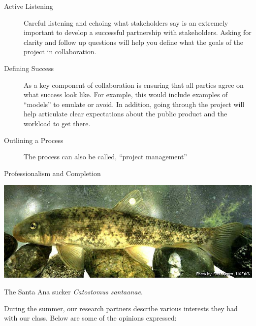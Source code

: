\documentclass{tufte-handout}\usepackage[]{graphicx}\usepackage[]{color}
\begin{document}
\begin{description}
  \item[Active Listening] Careful listening and echoing what stakeholders say is an extremely important to develop a successful partnership with stakeholders. Asking for clarity and follow up questions will help you define what the goals of the project in collaboration.
  \item[Defining Success] As a key component of collaboration is ensuring that all parties agree on what success look like. For example, this would include examples of ``models'' to emulate or avoid. In addition, going through the project will help articulate clear expectations about the public product and the workload to get there.
  \item[Outlining a Process] The process can also be called, ``project management''
  \item[Professionalism and Completion]
\end{description}

\begin{marginfigure}
   \includegraphics[width=1.0\textwidth]{Catostomus_santaanae.jpg}
  \caption{The Santa Ana sucker \emph{Catostomus santaanae}.}
\end{marginfigure}

During the summer, our research partners describe various interests they had with our class. Below are some of the opinions expressed:
\end{document}
